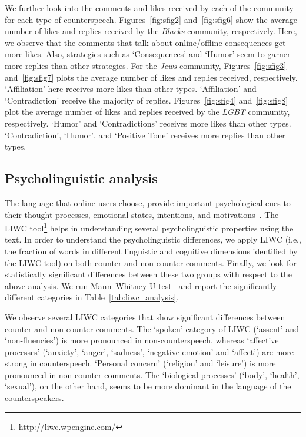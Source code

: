 \documentclass[11pt,a4paper]{article}
\begin{document}
{We further look into the comments and likes received by each of the community for each type of counterspeech. Figures~\ref{fig:sfig2} and~\ref{fig:sfig6} show the average number of likes and replies received by the {\sl Blacks} community, respectively. Here, we observe that the comments that talk about online/offline consequences get more likes. Also, strategies such as `Consequences' and `Humor' seem to garner more replies than other strategies. For the {\sl Jews} community, Figures~\ref{fig:sfig3} and~\ref{fig:sfig7} plots the average number of likes and replies received, respectively. `Affiliation' here receives more likes than other types. `Affiliation' and `Contradiction' receive the majority of replies. Figures~\ref{fig:sfig4} and~\ref{fig:sfig8} plot the average number of likes and replies received by the {\sl LGBT} community, respectively. `Humor' and `Contradictions' receives more likes than other types. `Contradiction', `Humor', and `Positive Tone' receives more replies than other types. 







\subsection{Psycholinguistic analysis}
The language that online users choose, provide important psychological cues to their thought processes, emotional states, intentions, and motivations~\cite{tausczik2010psychological}. The LIWC tool\footnote{http://liwc.wpengine.com/} helps in understanding several psycholinguistic properties using the text. In order to understand the psycholinguistic differences, we apply LIWC (i.e., the fraction of words in different linguistic and cognitive dimensions identified by the LIWC tool) on both counter and non-counter comments. Finally, we look for statistically significant differences between these two groups with respect to the above analysis. We run Mann–Whitney U test~\cite{mann1947test} and report the significantly different categories in Table~\ref{tab:liwc_analysis}.

We observe several LIWC categories that show significant differences between counter and non-counter comments. The `spoken' category of LIWC (`assent' and `non-fluencies') is more pronounced in non-counterspeech, whereas `affective processes' (`anxiety', `anger', `sadness', `negative emotion' and `affect') are more strong in counterspeech. `Personal concern' (`religion' and `leisure') is more pronounced in non-counter comments. The `biological processes' (`body', `health', `sexual'), on the other hand, seems to be more dominant in the language of the counterspeakers.

}
\end{document}
